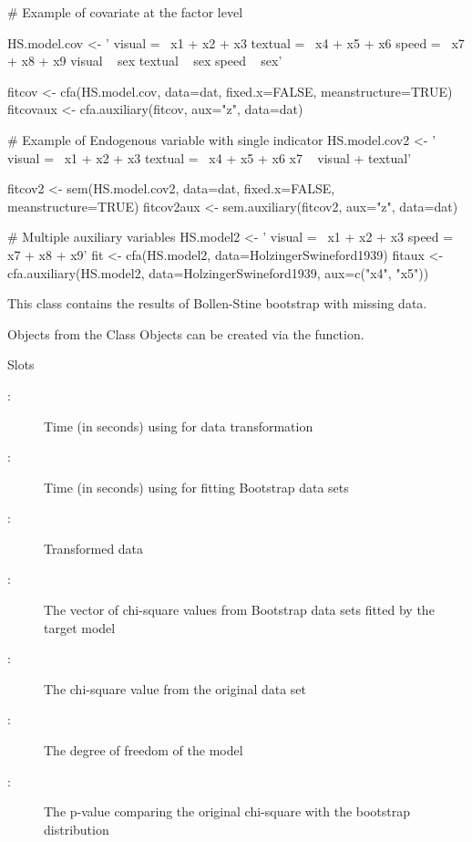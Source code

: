\documentclass[a4paper]{book}
\begin{document}
\begin{Examples}
\begin{ExampleCode}
# Example of covariate at the factor level

HS.model.cov <- ' visual  =~ x1 + x2 + x3
              textual =~ x4 + x5 + x6
             speed   =~ x7 + x8 + x9 
			  visual ~ sex
			  textual ~ sex
			  speed ~ sex'
	  
fitcov <- cfa(HS.model.cov, data=dat, fixed.x=FALSE, meanstructure=TRUE) 
fitcovaux <- cfa.auxiliary(fitcov, aux="z", data=dat)

# Example of  Endogenous variable with single indicator 
HS.model.cov2 <- ' visual  =~ x1 + x2 + x3
              textual =~ x4 + x5 + x6
              x7 ~ visual + textual'
 	  
fitcov2 <- sem(HS.model.cov2, data=dat, fixed.x=FALSE, meanstructure=TRUE) 
fitcov2aux <- sem.auxiliary(fitcov2, aux="z", data=dat)

# Multiple auxiliary variables
HS.model2 <- ' visual  =~ x1 + x2 + x3
              speed   =~ x7 + x8 + x9'
fit <- cfa(HS.model2, data=HolzingerSwineford1939)
fitaux <- cfa.auxiliary(HS.model2, data=HolzingerSwineford1939, aux=c("x4", "x5")) 
\end{ExampleCode}
\end{Examples}
%
\begin{Description}\relax
This class contains the results of Bollen-Stine bootstrap with missing data.
\end{Description}
%
\begin{Section}{Objects from the Class}
Objects can be created via the  function.
\end{Section}
%
\begin{Section}{Slots}
\begin{description}

\item[:] Time (in seconds) using for data transformation
\item[:] Time (in seconds) using for fitting Bootstrap data sets
\item[:] Transformed data
\item[:] The vector of chi-square values from Bootstrap data sets fitted by the target model
\item[:] The chi-square value from the original data set
\item[:] The degree of freedom of the model
\item[:] The p-value comparing the original chi-square with the bootstrap distribution

\end{description}

\end{Section}
\end{document}
